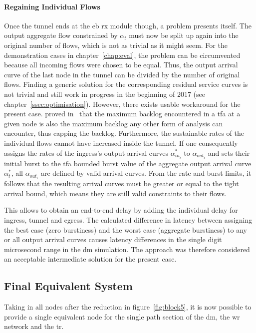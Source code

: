\paragraph{Regaining Individual Flows}
Once the tunnel ends at the \gls{eb} \gls{rx} module though, a problem presents itself. The output aggregate flow constrained by $\alpha_t$ must now be split up again into the original number of flows, which is not as trivial as it might seem.
For the demonstration cases in chapter~\ref{chap:eval}, the problem can be circumvented because all incoming flows were chosen to be equal. Thus, the output arrival curve of the last node in the tunnel can be divided by the number of original flows.
Finding a generic solution for the corresponding residual service curves is not trivial and still work in progress in the beginning of 2017 (see chapter~\ref{ssec:optimisation}). However, there exists usable workaround for the present case.
\citeauthor{bondorf_improving_2016} proved in~\cite{bondorf_improving_2016} that the maximum backlog encountered in a \gls{tfa} at a given node is also the maximum backlog any other form of analysis can encounter, thus capping the backlog.
Furthermore, the sustainable rates of the individual flows cannot have increased inside the tunnel. If one consequently assigns the rates of the ingress's output arrival curves $\alpha^*_{{in}_i}$ to $\alpha_{{out}_i}$ and sets their initial burst to the \gls{tfa} bounded burst value of the aggregate output arrival curve $\alpha_t^*$, all $\alpha_{{out}_i}$ are defined by valid arrival curves. From the rate and burst limits, it follows that the resulting arrival curves must be greater or equal to the tight arrival bound, which means they are still valid constraints to their flows. 
\par
This allows to obtain an end-to-end delay by adding the individual delay for ingress, tunnel and egress.   The calculated difference in latency between assigning the best case (zero burstiness) and the worst case (aggregate burstiness) to any or all output arrival curves causes latency differences in the single digit microsecond range in the \gls{dm} simulation. The approach was therefore considered an acceptable intermediate solution for the present case. 

\iffalse
\subsection{Final Equivalent System}
Taking in all nodes after the reduction in figure~\ref{fig:block5}, it is now possible to provide a single equivalent node for the single path section of the \gls{dm}, the \gls{wr} network and the \gls{tr}.

